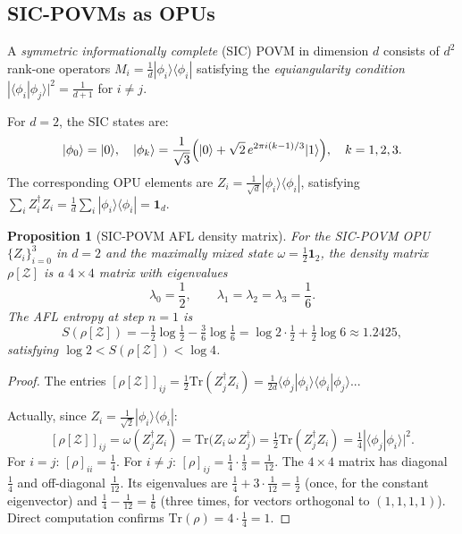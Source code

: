 \documentclass[12pt,a4paper]{article}
\newtheorem{proposition}[theorem]{Proposition}
\begin{document}
\subsection{SIC-POVMs as OPUs}

A \emph{symmetric informationally complete} (SIC) POVM in dimension $d$ consists
of $d^2$ rank-one operators $M_i = \frac{1}{d}|\phi_i\rangle\langle\phi_i|$
satisfying the \emph{equiangularity condition}
$|\langle\phi_i|\phi_j\rangle|^2 = \frac{1}{d+1}$ for $i\neq j$.

For $d=2$, the SIC states are:
\begin{equation}\label{eq:sic_d2}
  |\phi_0\rangle = |0\rangle,\quad
  |\phi_k\rangle = \frac{1}{\sqrt{3}}\Bigl(|0\rangle + \sqrt{2}\,e^{2\pi i(k-1)/3}|1\rangle\Bigr),
  \quad k=1,2,3.
\end{equation}
The corresponding OPU elements are $Z_i = \frac{1}{\sqrt{d}}|\phi_i\rangle\langle\phi_i|$,
satisfying $\sum_i Z_i^\dagger Z_i = \frac{1}{d}\sum_i |\phi_i\rangle\langle\phi_i| = \mathbf{1}_d$.

\begin{proposition}[SIC-POVM AFL density matrix]\label{prop:sic_afl}
For the SIC-POVM OPU $\{Z_i\}_{i=0}^{3}$ in $d=2$ and the maximally mixed state
$\omega = \frac{1}{2}\mathbf{1}_2$, the density matrix $\rho[\mathcal{Z}]$ is a
$4\times 4$ matrix with eigenvalues
\[
  \lambda_0 = \frac{1}{2},\qquad
  \lambda_1 = \lambda_2 = \lambda_3 = \frac{1}{6}.
\]
The AFL entropy at step $n=1$ is
\[
  S(\rho[\mathcal{Z}]) = -\tfrac{1}{2}\log\tfrac{1}{2} - \tfrac{3}{6}\log\tfrac{1}{6}
  = \log 2 \cdot\tfrac{1}{2} + \tfrac{1}{2}\log 6
  \approx 1.2425,
\]
satisfying $\log 2 < S(\rho[\mathcal{Z}]) < \log 4$.
\end{proposition}

\begin{proof}
The entries $[\rho[\mathcal{Z}]]_{ij} = \frac{1}{2}\mathrm{Tr}(Z_j^\dagger Z_i)
= \frac{1}{2d}\langle\phi_j|\phi_i\rangle\langle\phi_i|\phi_j\rangle$...

Actually, since $Z_i = \frac{1}{\sqrt{2}}|\phi_i\rangle\langle\phi_i|$:
\[
  [\rho[\mathcal{Z}]]_{ij}
  = \omega(Z_j^\dagger Z_i)
  = \mathrm{Tr}\!\bigl(Z_i\,\omega\,Z_j^\dagger\bigr)
  = \tfrac{1}{2}\mathrm{Tr}(Z_j^\dagger Z_i)
  = \tfrac{1}{4}|\langle\phi_j|\phi_i\rangle|^2.
\]
For $i=j$: $[\rho]_{ii} = \frac{1}{4}$.  For $i\neq j$: $[\rho]_{ij} = \frac{1}{4}\cdot\frac{1}{3} = \frac{1}{12}$.
The $4\times 4$ matrix has diagonal $\frac{1}{4}$ and off-diagonal $\frac{1}{12}$.
Its eigenvalues are $\frac{1}{4} + 3\cdot\frac{1}{12} = \frac{1}{2}$ (once, for the
constant eigenvector) and $\frac{1}{4} - \frac{1}{12} = \frac{1}{6}$ (three times,
for vectors orthogonal to $(1,1,1,1)$).  Direct computation confirms $\mathrm{Tr}(\rho) = 4\cdot\frac{1}{4} = 1$.
\end{proof}
\end{document}
